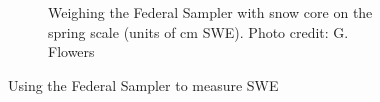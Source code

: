 \documentclass[12pt]{article}
\begin{document}
\begin{figure}
\begin{subfigure}[b]{0.56\textwidth}
        \caption{Weighing the Federal Sampler with snow core on the spring scale (units of cm SWE). Photo credit: G. Flowers}
        \label{photo_swe2}
    \end{subfigure}

    \caption{Using the Federal Sampler to measure SWE}
    \label{photo_swe}
\end{figure}
 
	
\end{document}
